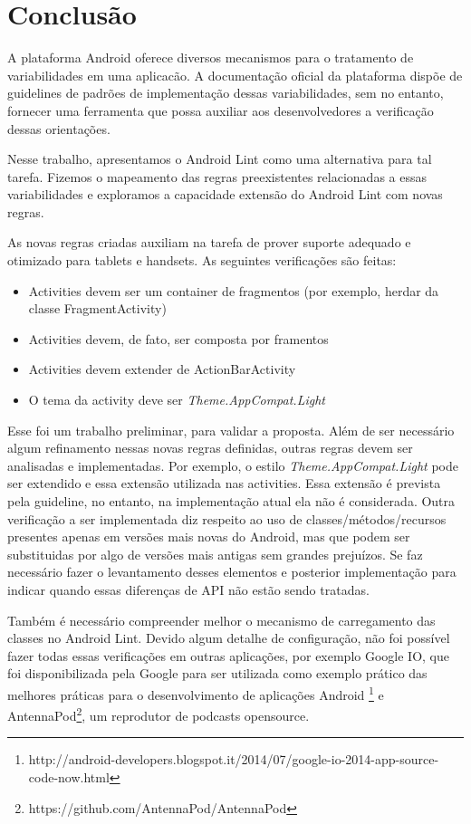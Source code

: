 \chapter{Conclusão}
\label{conclusao}
A plataforma Android oferece diversos mecanismos para o tratamento de variabilidades
em uma aplicacão. A documentação oficial da plataforma dispõe de guidelines de 
padrões de implementação dessas variabilidades, sem no entanto, fornecer uma ferramenta
que possa auxiliar aos desenvolvedores a verificação dessas orientações.

Nesse trabalho, apresentamos o Android Lint como uma alternativa para tal tarefa.
Fizemos o mapeamento das regras preexistentes relacionadas a essas variabilidades
e exploramos a capacidade extensão do Android Lint com novas regras. 

As novas regras criadas auxiliam na tarefa de prover suporte adequado e otimizado
para tablets e handsets. As seguintes verificações são feitas:
\begin{itemize}
  \item{Activities devem ser um container de fragmentos (por exemplo, herdar da
  classe FragmentActivity)}
  \item{Activities devem, de fato, ser composta por framentos}
  \item{Activities devem extender de ActionBarActivity}
  \item{O tema da activity deve ser {\it Theme.AppCompat.Light}}
\end{itemize}

Esse foi um trabalho preliminar, para validar a proposta. Além de ser necessário
algum refinamento nessas novas regras definidas, outras regras devem ser analisadas
e implementadas. Por exemplo, o estilo {\it Theme.AppCompat.Light} pode ser extendido
e essa extensão utilizada nas activities. Essa extensão é prevista pela guideline,
no entanto, na implementação atual ela não é considerada. Outra verificação a ser
implementada diz respeito ao uso de classes/métodos/recursos presentes apenas em
versões mais novas do Android, mas que podem ser substituidas por algo de versões
mais antigas sem grandes prejuízos. Se faz necessário fazer o levantamento desses
elementos e posterior implementação para indicar quando essas diferenças de API
não estão sendo tratadas.

Também é necessário compreender melhor o mecanismo de carregamento das classes no
Android Lint. Devido algum detalhe de configuração, não foi possível fazer todas
essas verificações em outras aplicações, por exemplo Google IO, que foi disponibilizada
pela Google para ser utilizada como exemplo prático das melhores práticas para o
desenvolvimento de aplicações Android
\footnote{http://android-developers.blogspot.it/2014/07/google-io-2014-app-source-code-now.html}
e AntennaPod\footnote{https://github.com/AntennaPod/AntennaPod}, um reprodutor de
podcasts opensource.


